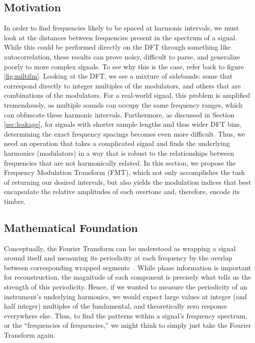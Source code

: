 \documentclass[11pt,twoside]{report}
\numberwithin{thm}{section}
\numberwithin{equation}{section}
\begin{document}
\subsection{Motivation}
In order to find frequencies likely to be spaced at harmonic intervals, we must look at the distances between frequencies present in the spectrum of a signal. While this could be performed directly on the DFT through something like autocorrelation, these results can prove noisy, difficult to parse, and generalize poorly to more complex signals. To see why this is the case, refer back to figure \ref{fig:miltifm}. Looking at the DFT, we see a mixture of sidebands: some that correspond directly to integer multiples of the modulators, and others that are combinations of the modulators. For a real-world signal, this problem is amplified tremendously, as multiple sounds can occupy the same frequency ranges, which can obfuscate these harmonic intervals. Furthermore, as discussed in Section \ref{sec:leakage}, for signals with shorter sample lengths and thus wider DFT bins, determining the exact frequency spacings becomes even more difficult. Thus, we need an operation that takes a complicated signal and finds the underlying harmonics (modulators) in a way that is robust to the relationships between frequencies that are not harmonically related. In this section, we propose the Frequency Modulation Transform (FMT), which not only accomplishes the task of returning our desired intervals, but also yields the modulation indices that best encapsulate the relative amplitudes of each overtone and, therefore, encode its timbre.
\subsection{Mathematical Foundation}
Conceptually, the Fourier Transform can be understood as wrapping a signal around itself and measuring its periodicity at each frequency by the overlap between corresponding wrapped segments~\cite{3B1B}. While phase information is important for reconstruction, the magnitude of each component is precisely what tells us the strength of this periodicity. Hence, if we wanted to measure the periodicity of an instrument's underlying harmonics, we would expect large values at integer (and half integer) multiples of the fundamental, and theoretically zero response everywhere else. Thus, to find the patterns within a signal's frequency spectrum, or the ``frequencies of frequencies,'' we might think to simply just take the Fourier Transform again. 
\end{document}
